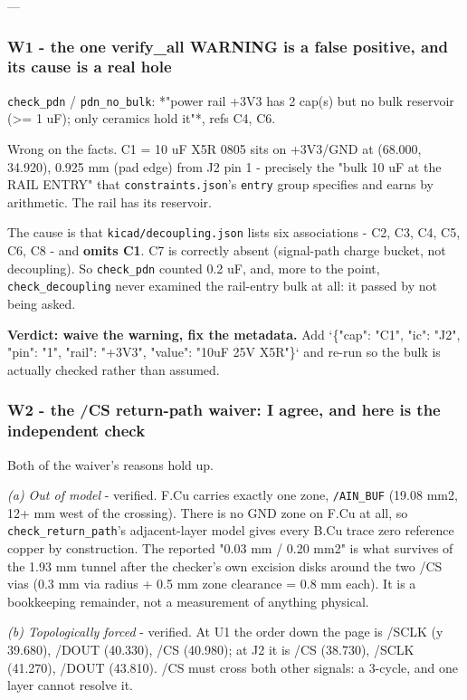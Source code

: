 \documentclass[11pt,a4paper]{article}
\begin{document}
---

\subsubsection*{W1 - the one verify\_all WARNING is a false positive, and its cause is a real hole}
\texttt{check\_pdn} / \texttt{pdn\_no\_bulk}: {*}"power rail +3V3 has 2 cap(s) but no bulk reservoir (\textgreater{}= 1 uF); only ceramics hold it"{*}, refs C4, C6.

Wrong on the facts. C1 = 10 uF X5R 0805 sits on +3V3/GND at (68.000, 34.920), 0.925 mm (pad edge) from J2 pin 1 - precisely the "bulk 10 uF at the RAIL ENTRY" that \texttt{constraints.json}'s \texttt{entry} group specifies and earns by arithmetic. The rail has its reservoir.

The cause is that \texttt{kicad/decoupling.json} lists six associations - C2, C3, C4, C5, C6, C8 - and \textbf{omits C1}. C7 is correctly absent (signal-path charge bucket, not decoupling). So \texttt{check\_pdn} counted 0.2 uF, and, more to the point, \texttt{check\_decoupling} never examined the rail-entry bulk at all: it passed by not being asked.

\textbf{Verdict: waive the warning, fix the metadata.} Add `\{"cap": "C1", "ic": "J2", "pin": "1", "rail": "+3V3", "value": "10uF 25V X5R"\}` and re-run so the bulk is actually checked rather than assumed.

\subsubsection*{W2 - the /CS return-path waiver: I agree, and here is the independent check}
Both of the waiver's reasons hold up.

\emph{(a) Out of model} - verified. F.Cu carries exactly one zone, \texttt{/AIN\_BUF} (19.08 mm2, 12+ mm west of the crossing). There is no GND zone on F.Cu at all, so \texttt{check\_return\_path}'s adjacent-layer model gives every B.Cu trace zero reference copper by construction. The reported "0.03 mm / 0.20 mm2" is what survives of the 1.93 mm tunnel after the checker's own excision disks around the two /CS vias (0.3 mm via radius + 0.5 mm zone clearance = 0.8 mm each). It is a bookkeeping remainder, not a measurement of anything physical.

\emph{(b) Topologically forced} - verified. At U1 the order down the page is /SCLK (y 39.680), /DOUT (40.330), /CS (40.980); at J2 it is /CS (38.730), /SCLK (41.270), /DOUT (43.810). /CS must cross both other signals: a 3-cycle, and one layer cannot resolve it.
\end{document}

